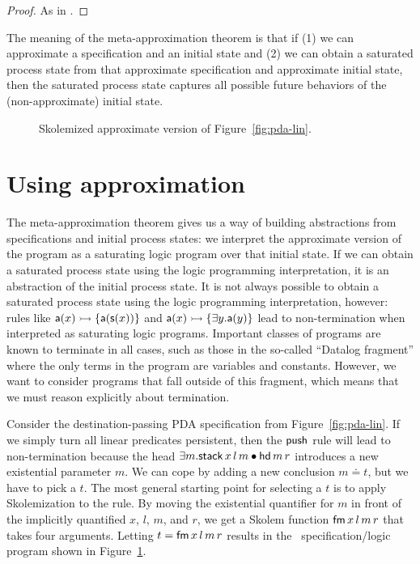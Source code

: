 \begin{proof}
As in \cite[Theorem 3]{simmons11logical}.
\end{proof}

The meaning of the meta-approximation theorem is that if (1) we can
approximate a specification and an initial state and (2) we can obtain
a saturated process state from that approximate specification
and approximate initial state, then the saturated process state captures
all possible future behaviors of the (non-approximate) initial state. 

\begin{figure}
\caption{Skolemized approximate version of Figure~\ref{fig:pda-lin}.}
\label{fig:pda-pers}
\end{figure}



\section{Using approximation}

The meta-approximation theorem gives us a way of building abstractions
from specifications and initial process states: we interpret the
approximate version of the program as a saturating logic program over
that initial state. If we can obtain a saturated process state using
the logic programming interpretation, it is an abstraction of the
initial process state. It is not always possible to obtain a saturated
process state using the logic programming interpretation, however:
rules like ${\sf a}(x) \rightarrowtail \{ {\sf a}({\sf s}(x)) \}$ and ${\sf
  a}(x) \rightarrowtail \{ \exists y. {\sf a}(y) \}$ lead to non-termination
when interpreted as saturating logic programs. Important classes 
of programs are known to terminate in all cases, such as those in the
so-called ``Datalog fragment'' where the only terms in the program
are variables and constants. However, we want to consider programs
that fall outside of this fragment, which means that we must 
reason explicitly about termination.

Consider the destination-passing PDA specification from
Figure~\ref{fig:pda-lin}. If we simply turn all linear predicates
persistent, then the ${\sf push}$ rule will lead to non-termination
because the head $\exists m. {\sf stack}\,x\,l\,m \mathbin{\bullet} {\sf
  hd}\,m\,r$ introduces a new existential parameter $m$. We can cope
by adding a new conclusion $m \doteq t$, but we have to pick a $t$.
The most general starting point for selecting a $t$ is to apply
Skolemization to the rule. By moving the existential quantifier for
$m$ in front of the implicitly quantified $x$, $l$, $m$, and $r$, we
get a Skolem function ${\sf fm}\,x\,l\,m\,r$ that takes four
arguments. Letting $t = {\sf fm}\,x\,l\,m\,r$ results in the
\sls~specification/logic program shown in
Figure~\ref{fig:pda-pers}.

